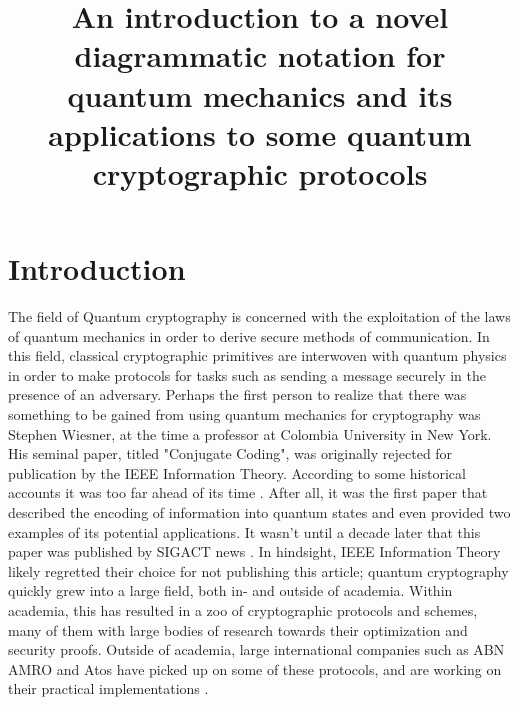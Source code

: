 \documentclass[]{article}
\title{An introduction to a novel diagrammatic notation for quantum mechanics and its applications to some quantum cryptographic protocols}
\author{}
\begin{document}
\maketitle

\begin{abstract}

\end{abstract}

\section{Introduction}

The field of Quantum cryptography is concerned with the exploitation of the laws of quantum mechanics in order to derive secure methods of communication. In this field, classical cryptographic primitives are interwoven with quantum physics in order to make protocols for tasks such as sending a message securely in the presence of an adversary. Perhaps the first person to realize that there was something to be gained from using quantum mechanics for cryptography was Stephen Wiesner, at the time a professor at Colombia University in New York. His seminal paper, titled "Conjugate Coding", was originally rejected for publication by the IEEE Information Theory. According to some historical accounts it was too far ahead of its time \cite{Morsch2008}. After all, it was the first paper that described the encoding of information into quantum states and even provided two examples of its potential applications. It wasn't until a decade later that this paper was published by SIGACT news \cite{WeisnerConjugateCoding}. In hindsight, IEEE Information Theory likely regretted their choice for not publishing this article; quantum cryptography quickly grew into a large field, both in- and outside of academia. Within academia, this has resulted in a zoo of cryptographic protocols and schemes, many of them with large bodies of research towards their optimization and security proofs. Outside of academia, large international companies such as ABN AMRO and Atos have picked up on some of these protocols, and are working on their practical implementations \cite{abnamro,Buding2015}.
\end{document}
